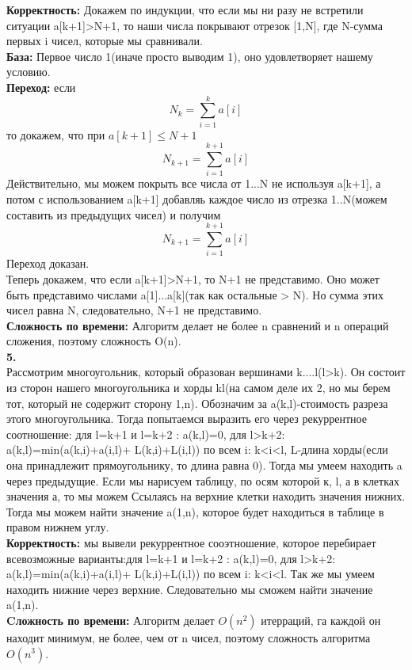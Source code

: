 \documentclass[a4paper,12pt]{article}
\begin{document}
\textbf{Корректность:} Докажем по индукции, что если мы ни разу не встретили ситуации a[k+1]>N+1, то наши числа покрывают отрезок [1,N], где N-сумма первых i чисел, которые мы сравнивали.\\
\textbf{База:} Первое число 1(иначе просто выводим 1), оно удовлетворяет нашему условию.\\
\textbf{Переход:} если \[N_{k}=\sum_{i=1}^{k} a[i]\]
то докажем, что при $a[k+1]\leq N+1$  \[N_{k+1}=\sum_{i=1}^{k+1} a[i]\]
Действительно, мы можем покрыть все числа от 1...N не используя a[k+1], а потом с использованием  a[k+1] добавляь каждое число из отрезка 1..N(можем составить из предыдущих чисел) и получим \[N_{k+1}=\sum_{i=1}^{k+1} a[i]\]
Переход доказан.\\
Теперь докажем, что если a[k+1]>N+1, то N+1 не представимо. Оно может быть представимо числами a[1]...a[k](так как остальные > N). Но сумма этих чисел равна N, следовательно, N+1 не представимо.\\
\textbf{Сложность по времени:} Алгоритм делает  не более n сравнений и n операций сложения, поэтому сложность O(n).\\
\textbf{5.}\\
Рассмотрим многоугольник, который образован вершинами k....l(l>k). Он состоит из  сторон нашего многоугольника и хорды kl(на самом деле их 2, но мы берем тот, который не содержит сторону 1,n). Обозначим за a(k,l)-стоимость разреза этого многоугольника. Тогда попытаемся выразить его через рекуррентное соотношение: для l=k+1 и l=k+2 : a(k,l)=0, для l>k+2: a(k,l)=min(a(k,i)+a(i,l)+ L(k,i)+L(i,l)) по всем i: k<i<l, L-длина хорды(если она принадлежит прямоугольнику, то длина равна 0). Тогда мы умеем находить a через предыдущие. Если мы нарисуем таблицу, по осям которой к, l, а в клетках значения  а, то мы можем Ссылаясь на верхние клетки находить значения нижних.\\Тогда мы можем найти значение a(1,n), которое будет находиться в таблице в правом нижнем углу. \\
\textbf{Корректность:} мы вывели рекуррентное сооэтношение, которое перебирает всевозможные варианты:для l=k+1 и l=k+2 : a(k,l)=0, для l>k+2: a(k,l)=min(a(k,i)+a(i,l)+ L(k,i)+L(i,l)) по всем i: k<i<l. Так же мы умеем находить нижние через верхние. Следовательно мы сможем найти значение a(1,n).\\
\textbf{Cложность по времени:} Алгоритм делает $O(n^2)$ итерраций, га каждой он находит минимум, не более, чем от n чисел, поэтому сложность алгоритма $O(n^3)$.
\end{document}
